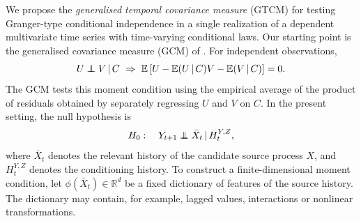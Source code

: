 \documentclass[12pt]{article}
\def\E{\mathbb{E}}
\newcommand\independent{\protect\mathpalette{\protect\independenT}{\perp}}
\def\independenT#1#2{\mathrel{\rlap{$#1#2$}\mkern2mu{#1#2}}}
\newcommand\given{\,|\,}
\numberwithin{equation}{section}
\begin{document}
We propose the \emph{generalised temporal covariance measure} (GTCM) for testing Granger-type conditional independence in a single realization of a dependent multivariate time series with time-varying conditional laws. Our starting point is the generalised covariance measure (GCM) of \citet{shah2020hardness}. For independent observations,
\begin{equation*}
U\independent V\given C
~\Rightarrow~
\E\left[
{U-\E(U\given C)}
{V-\E(V\given C)}
\right]
=0.
\end{equation*}
The GCM tests this moment condition using the empirical average of the product of residuals obtained by separately regressing \(U\) and \(V\) on \(C\). In the present setting, the null hypothesis is
\begin{equation}
H_0:
\quad
Y_{t+1}\independent \bar X_t
\given H_t^{Y,Z},
\label{eq:null_hyp-multi}
\end{equation}
where \(\bar X_t\) denotes the relevant history of the candidate source process \(X\), and \(H_t^{Y,Z}\) denotes the conditioning history. To construct a finite-dimensional moment condition, let \(\phi(\bar X_t)\in\mathbb R^d\) be a fixed dictionary of features of the source history. The dictionary may contain, for example, lagged values, interactions or nonlinear transformations.
\end{document}
